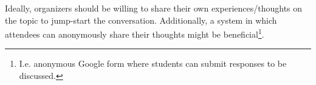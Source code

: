 \documentclass[addpoints,12pt]{exam}
\numberwithin{equation}{section}
\begin{document}
	Ideally, organizers should be willing to share their own experiences/thoughts on the topic to jump-start the conversation. Additionally, a system in which attendees can anonymously share their thoughts might be beneficial\footnote{I.e. anonymous Google form where students can submit responses to be discussed.}.	
	
	
	
	\nocite{*}
\end{document}
